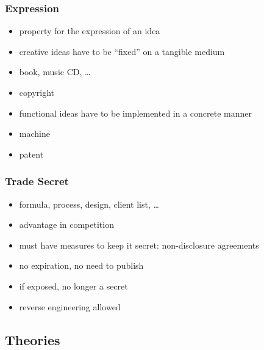 \documentclass[dvipsnames]{beamer}
\theoremstyle{plain}
\begin{document}
\begin{frame}
  \frametitle{Expression}

  \begin{itemize}
    \item property for the \alert{expression} of an idea

    \medskip
    \item creative ideas have to be ``fixed'' on a tangible medium
    \item book, music CD, \ldots
    \item \alert{copyright}

    \pause
    \medskip
    \item functional ideas have to be implemented in a concrete manner
    \item machine
    \item \alert{patent}
  \end{itemize}
\end{frame}

\begin{frame}
  \frametitle{Trade Secret}

  \begin{itemize}
    \item formula, process, design, client list, \ldots
    \item advantage in competition
    \item must have measures to keep it secret: non-disclosure agreements

    \pause
    \medskip
    \item no expiration, no need to publish
    \item if exposed, no longer a secret

    \medskip
    \item \alert{reverse engineering} allowed
  \end{itemize}
\end{frame}

\subsection{Theories}
\end{document}
